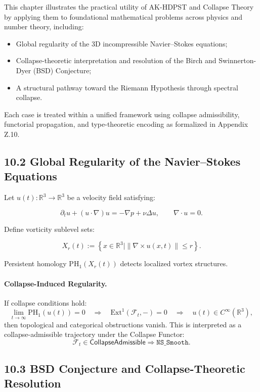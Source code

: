 \documentclass[11pt]{article}
\begin{document}
This chapter illustrates the practical utility of AK-HDPST and Collapse Theory by applying them to foundational mathematical problems across physics and number theory, including:

\begin{itemize}
    \item Global regularity of the 3D incompressible Navier–Stokes equations;
    \item Collapse-theoretic interpretation and resolution of the Birch and Swinnerton-Dyer (BSD) Conjecture;
    \item A structural pathway toward the Riemann Hypothesis through spectral collapse.
\end{itemize}

Each case is treated within a unified framework using collapse admissibility, functorial propagation, and type-theoretic encoding as formalized in Appendix Z.10.

\subsection*{10.2 Global Regularity of the Navier–Stokes Equations}

Let \( u(t) : \mathbb{R}^3 \to \mathbb{R}^3 \) be a velocity field satisfying:

\[
\partial_t u + (u \cdot \nabla)u = -\nabla p + \nu \Delta u, \qquad \nabla \cdot u = 0.
\]

Define vorticity sublevel sets:

\[
X_r(t) := \left\{ x \in \mathbb{R}^3 \mid \| \nabla \times u(x,t) \| \leq r \right\}.
\]

Persistent homology \( \mathrm{PH}_1(X_r(t)) \) detects localized vortex structures.

\paragraph{Collapse-Induced Regularity.}
If collapse conditions hold:
\[
\lim_{t \to \infty} \mathrm{PH}_1(u(t)) = 0 \quad \Rightarrow \quad \mathrm{Ext}^1(\mathcal{F}_t, -) = 0 \quad \Rightarrow \quad u(t) \in C^\infty(\mathbb{R}^3),
\]
then topological and categorical obstructions vanish. This is interpreted as a collapse-admissible trajectory under the Collapse Functor:
\[
\mathcal{F}_t \in \mathsf{CollapseAdmissible} \Rightarrow \texttt{NS\_Smooth}.
\]

\subsection*{10.3 BSD Conjecture and Collapse-Theoretic Resolution}
\end{document}
